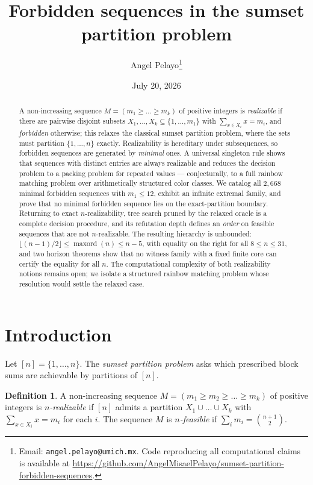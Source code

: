\documentclass[11pt]{article}
\title{Forbidden sequences in the sumset partition problem}
\author{Angel Pelayo\thanks{Email: \texttt{angel.pelayo@umich.mx}. Code reproducing all
computational claims is available at
\url{https://github.com/AngelMisaelPelayo/sumset-partition-forbidden-sequences}.}}
\date{July 20, 2026}
\theoremstyle{definition}
\newtheorem{definition}[theorem]{Definition}
\theoremstyle{remark}
\newcommand{\maxord}{\operatorname{maxord}}
\newcommand{\intv}[1]{[#1]}
\begin{document}
\maketitle

\begin{abstract}
A non-increasing sequence $M=(m_1\ge\dots\ge m_k)$ of positive integers is
\emph{realizable} if there are pairwise disjoint subsets
$X_1,\dots,X_k\subseteq\{1,\dots,m_1\}$ with $\sum_{x\in X_i}x=m_i$, and
\emph{forbidden} otherwise; this relaxes the classical sumset partition problem,
where the sets must partition $\{1,\dots,n\}$ exactly. Realizability is
hereditary under subsequences, so forbidden sequences are generated by
\emph{minimal} ones. A universal singleton rule shows that sequences with
distinct entries are always realizable and reduces the decision problem to a
packing problem for repeated values --- conjecturally, to a full rainbow matching
problem over arithmetically structured color classes. We catalog all $2{,}668$
minimal forbidden sequences with $m_1\le12$, exhibit an infinite extremal
family, and prove that no minimal forbidden sequence lies on the
exact-partition boundary. Returning to exact $n$-realizability, tree search
pruned by the relaxed oracle is a complete decision procedure, and its
refutation depth defines an \emph{order} on feasible sequences that are not
$n$-realizable.
The resulting hierarchy is unbounded:
$\lfloor(n-1)/2\rfloor\le\maxord(n)\le n-5$, with equality on the right for all
$8\le n\le31$, and two horizon theorems show that no witness family with a
fixed finite core can certify the equality for all $n$. The computational
complexity of both realizability notions remains open; we isolate a structured
rainbow matching problem whose resolution would settle the relaxed case.
\end{abstract}

\section{Introduction}\label{sec:intro}

Let $\intv{n}=\{1,\dots,n\}$. The \emph{sumset partition problem} asks which
prescribed block sums are achievable by partitions of $\intv{n}$.

\begin{definition}\label{def:nrealizable}
A non-increasing sequence $M=(m_1\ge m_2\ge\dots\ge m_k)$ of positive integers is
\emph{$n$-realizable} if $\intv{n}$ admits a partition $X_1\cup\dots\cup X_k$ with
$\sum_{x\in X_i}x=m_i$ for each $i$. The sequence $M$ is \emph{$n$-feasible} if
$\sum_i m_i=\binom{n+1}{2}$.
\end{definition}
\end{document}
